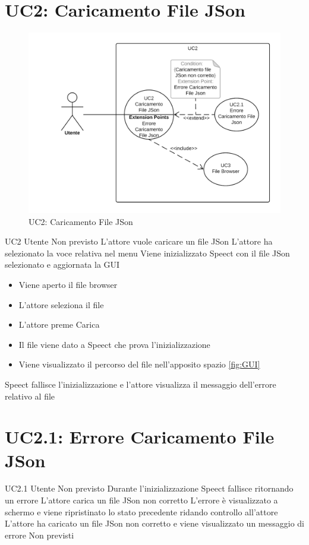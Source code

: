 \documentclass[../AnalisideiRequisiti.tex]{subfiles}
\begin{document}
	\section{UC2: Caricamento File JSon}
	\begin{figure}[H]
		\centering
		\includegraphics[width=\textwidth]{../img/UC2.png}
		\caption{UC2: Caricamento File JSon}
	\end{figure}
	\UserCase
	{UC2}
	{Utente}
	{Non previsto}
	{L'attore vuole caricare un file JSon}
	{L'attore ha selezionato la voce relativa nel menu }
	{Viene inizializzato Speect con il file JSon selezionato e aggiornata la GUI}
	{
		\begin{itemize}
			\item{} Viene aperto il file browser 
			\item{} L'attore seleziona il file 
			\item{} L'attore preme Carica
			\item{} Il file viene dato a Speect che prova l'inizializzazione
			\item{} Viene visualizzato il percorso del file nell'apposito spazio \ref{fig:GUI}
		\end{itemize}
	}
	{Speect fallisce l'inizializzazione e l'attore visualizza il messaggio dell'errore relativo al file }
	
	\section{UC2.1: Errore Caricamento File JSon}
	\UserCase
	{UC2.1}
	{Utente}
	{Non previsto}
	{Durante l'inizializzazione Speect fallisce ritornando un errore}
	{L'attore carica un file JSon non corretto}
	{L'errore è visualizzato a schermo e viene ripristinato lo stato precedente ridando controllo all'attore}
	{L'attore ha caricato un file JSon non corretto e viene visualizzato un messaggio di errore}
	{Non previsti}
\end{document}
